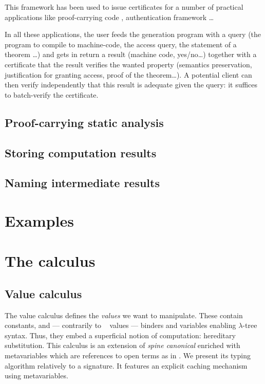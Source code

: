 \documentclass[9pt]{sigplanconf}
\begin{document}
This framework has been used to issue certificates for a number of
practical applications like proof-carrying code
\cite{necula1997proof}, authentication framework \cite{appel1999proof}
\ldots %

In all these applications, the user feeds the generation program with
a query (the program to compile to machine-code, the access query, the
statement of a theorem \ldots) and gets in return a result (machine
code, yes/no\ldots) together with a certificate that the result
verifies the wanted property (semantics preservation, justification
for granting access, proof of the theorem\ldots). A potential client
can then verify independently that this result is adequate given the
query: it suffices to batch-verify the certificate.

\subsection{Proof-carrying static analysis}

\subsection{Storing computation results}
\subsection{Naming intermediate results}

\section{Examples}



\section{The calculus}

\subsection{Value calculus}

The value calculus defines the \emph{values} we want to
manipulate. These contain constants, and --- contrarily to \eg\
 values --- binders and variables enabling $\lambda$-tree
syntax. Thus, they embed a superficial notion of computation:
hereditary substitution. This calculus is an extension of \emph{spine
  canonical \LF} \cite{pfenning2007term} enriched with metavariables
which are references to open terms as in
\cite{nanevski2008contextual}. We present its typing algorithm
relatively to a signature. It features an explicit caching mechanism
using metavariables.
\end{document}

